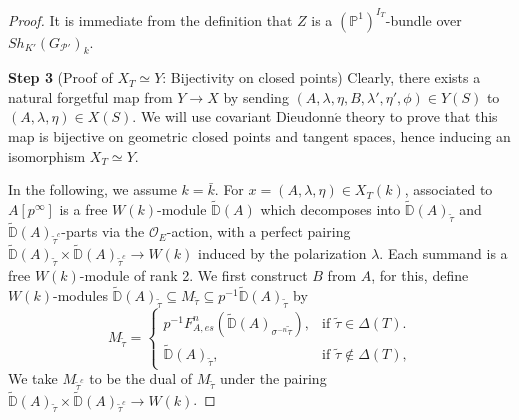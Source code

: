 \documentclass{article}
\begin{document}
\begin{proof}
It is immediate from the definition that $Z$ is a $(\mathbb{P}^1)^{I_T}$-bundle over $Sh_{K'}(G_{\mathcal{P}'})_k$.



\medskip
\noindent
\textbf{Step 3} (Proof of $X_T\simeq Y$: Bijectivity on closed points) Clearly, there exists a natural forgetful map from $Y\to X$ by sending $(A,\lambda,\eta,B,\lambda',\eta',\phi)\in Y(S)$ to $(A,\lambda,\eta)\in X(S)$. We will use covariant Dieudonn$\acute{\text{e}}$ theory to prove that this map is bijective on geometric closed points and tangent spaces, hence inducing an isomorphism $X_T\simeq Y$.

In the following, we assume $k=\bar{k}$. For $x=(A,\lambda,\eta)\in X_T(k)$, associated to $A[p^\infty]$ is a free $W(k)$-module $\tilde{\mathbb{D}}(A)$ which decomposes into $\tilde{\mathbb{D}}(A)_{\tilde\tau}$ and $\tilde{\mathbb{D}}(A)_{\tilde\tau^c}$-parts via the $\mathcal{O}_E$-action, with a perfect pairing $\tilde{\mathbb{D}}(A)_{\tilde\tau}\times\tilde{\mathbb{D}}(A)_{\tilde\tau^c}\to W(k)$ induced by the polarization $\lambda$. Each summand is a free $W(k)$-module of rank 2. We first construct $B$ from $A$, for this, define $W(k)$-modules $\tilde{\mathbb{D}}(A)_{\tilde\tau}\subseteq M_{\tilde\tau}\subseteq p^{-1}\tilde{\mathbb{D}}(A)_{\tilde\tau}$ by
\begin{equation}
M_{\tilde\tau}=
\begin{cases}
p^{-1}F^n_{A,es}(\tilde{\mathbb{D}}(A)_{\sigma^{-n}\tilde\tau}), & \text{if $\tilde\tau\in\Delta(T)$.}\\
\tilde{\mathbb{D}}(A)_{\tilde\tau},  & \text{if $\tilde\tau\notin\Delta(T)$,}
\end{cases}
\end{equation}
We take $M_{\tilde\tau^c}$ to be the dual of $M_{\tilde\tau}$ under the pairing $\tilde{\mathbb{D}}(A)_{\tilde\tau}\times\tilde{\mathbb{D}}(A)_{\tilde\tau^c}\to W(k)$.


\end{proof}
\end{document}
